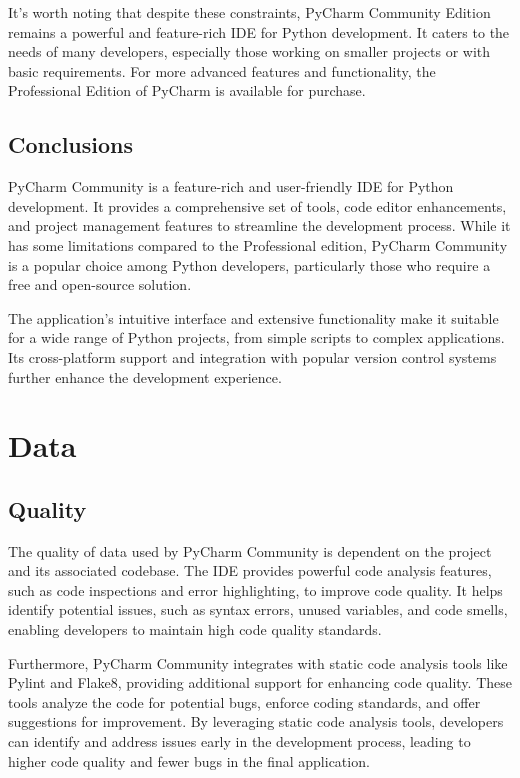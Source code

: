 It's worth noting that despite these constraints, PyCharm Community Edition remains a powerful and feature-rich IDE for Python development. It caters to the needs of many developers, especially those working on smaller projects or with basic requirements. For more advanced features and functionality, the Professional Edition of PyCharm is available for purchase.

\subsection{Conclusions}
PyCharm Community is a feature-rich and user-friendly IDE for Python development. It provides a comprehensive set of tools, code editor enhancements, and project management features to streamline the development process. While it has some limitations compared to the Professional edition, PyCharm Community is a popular choice among Python developers, particularly those who require a free and open-source solution.

The application's intuitive interface and extensive functionality make it suitable for a wide range of Python projects, from simple scripts to complex applications. Its cross-platform support and integration with popular version control systems further enhance the development experience.

\section{Data}

\subsection{Quality}

The quality of data used by PyCharm Community is dependent on the project and its associated codebase. The IDE provides powerful code analysis features, such as code inspections and error highlighting, to improve code quality. It helps identify potential issues, such as syntax errors, unused variables, and code smells, enabling developers to maintain high code quality standards.

Furthermore, PyCharm Community integrates with static code analysis tools like Pylint and Flake8, providing additional support for enhancing code quality. These tools analyze the code for potential bugs, enforce coding standards, and offer suggestions for improvement. By leveraging static code analysis tools, developers can identify and address issues early in the development process, leading to higher code quality and fewer bugs in the final application.

